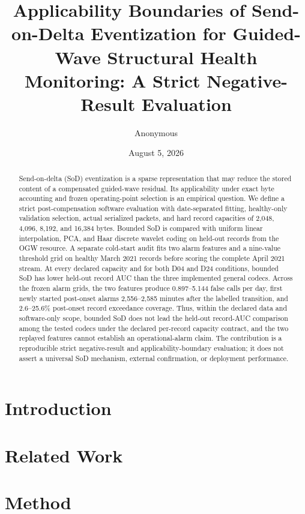 \documentclass[11pt,a4paper]{article}
\title{Applicability Boundaries of Send-on-Delta Eventization for Guided-Wave Structural Health Monitoring: A Strict Negative-Result Evaluation}
\author{Anonymous}
\date{August 5, 2026}
\begin{document}
\maketitle

\begin{abstract}
Send-on-delta (SoD) eventization is a sparse representation that may reduce
the stored content of a compensated guided-wave residual. Its applicability
under exact byte accounting and frozen operating-point selection is an
empirical question. We define a strict post-compensation software evaluation
with date-separated fitting, healthy-only validation selection, actual
serialized packets, and hard record capacities of 2,048, 4,096, 8,192, and
16,384 bytes. Bounded SoD is compared with uniform linear interpolation, PCA,
and Haar discrete wavelet coding on held-out records from the OGW resource. A
separate cold-start audit fits two alarm features and a nine-value
threshold grid on healthy March 2021 records before scoring the complete April
2021 stream. At every declared capacity and for both D04 and D24 conditions,
bounded SoD has lower held-out record AUC than the three implemented general
codecs. Across the frozen alarm grids, the two features produce 0.897--5.144
false calls per day, first newly started post-onset alarms 2,556--2,585
minutes after the labelled transition, and 2.6--25.6\% post-onset record
exceedance coverage. Thus, within the declared data and software-only
scope, bounded SoD does not lead the held-out record-AUC comparison among the
tested codecs under the declared per-record capacity contract, and the two
replayed features cannot establish an operational-alarm claim. The
contribution is a reproducible strict negative-result and applicability-boundary
evaluation; it does not assert a universal SoD mechanism, external
confirmation, or deployment performance.
\end{abstract}

\section{Introduction}


\section{Related Work}


\section{Method}

\end{document}
